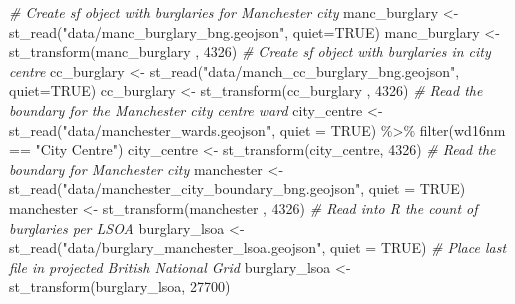 \documentclass[
  krantz2]{krantz}
\makeatletter
\newenvironment{Shaded}{\begin{snugshade}}{\end{snugshade}}
\newcommand{\AttributeTok}[1]{\textcolor[rgb]{0.61,0.61,0.61}{#1}}
\newcommand{\CommentTok}[1]{\textcolor[rgb]{0.37,0.37,0.37}{\textit{#1}}}
\newcommand{\ConstantTok}[1]{\textcolor[rgb]{0,0,0}{#1}}
\newcommand{\DecValTok}[1]{\textcolor[rgb]{0.06,0.06,0.06}{#1}}
\newcommand{\FunctionTok}[1]{\textcolor[rgb]{0,0,0}{#1}}
\newcommand{\NormalTok}[1]{#1}
\newcommand{\OtherTok}[1]{\textcolor[rgb]{0.37,0.37,0.37}{#1}}
\newcommand{\SpecialCharTok}[1]{\textcolor[rgb]{0,0,0}{#1}}
\newcommand{\StringTok}[1]{\textcolor[rgb]{0.5,0.5,0.5}{#1}}
\newenvironment{kframe}{%
\medskip{}
\setlength{\fboxsep}{.8em}
 \def\at@end@of@kframe{}%
 \ifinner\ifhmode%
  \def\at@end@of@kframe{\end{minipage}}%
  \begin{minipage}{\columnwidth}%
 \fi\fi%
 \def\FrameCommand##1{\hskip\@totalleftmargin \hskip-\fboxsep
 \colorbox{shadecolor}{##1}\hskip-\fboxsep
     \hskip-\linewidth \hskip-\@totalleftmargin \hskip\columnwidth}%
 \MakeFramed {\advance\hsize-\width
   \@totalleftmargin\z@ \linewidth\hsize
   \@setminipage}}%
 {\par\unskip\endMakeFramed%
 \at@end@of@kframe}
\renewenvironment{Shaded}{\begin{kframe}}{\end{kframe}}
\makeatother
\begin{document}
\begin{Shaded}
\begin{Highlighting}[]
\CommentTok{\# Create sf object with burglaries for Manchester city}
\NormalTok{manc\_burglary }\OtherTok{\textless{}{-}} \FunctionTok{st\_read}\NormalTok{(}\StringTok{"data/manc\_burglary\_bng.geojson"}\NormalTok{,}
                         \AttributeTok{quiet=}\ConstantTok{TRUE}\NormalTok{)}
\NormalTok{manc\_burglary }\OtherTok{\textless{}{-}} \FunctionTok{st\_transform}\NormalTok{(manc\_burglary , }\DecValTok{4326}\NormalTok{)}
\CommentTok{\# Create sf object with burglaries in city centre}
\NormalTok{cc\_burglary }\OtherTok{\textless{}{-}} \FunctionTok{st\_read}\NormalTok{(}\StringTok{"data/manch\_cc\_burglary\_bng.geojson"}\NormalTok{,}
                       \AttributeTok{quiet=}\ConstantTok{TRUE}\NormalTok{)}
\NormalTok{cc\_burglary }\OtherTok{\textless{}{-}} \FunctionTok{st\_transform}\NormalTok{(cc\_burglary , }\DecValTok{4326}\NormalTok{)}
\CommentTok{\# Read the boundary for the Manchester city centre ward}
\NormalTok{city\_centre }\OtherTok{\textless{}{-}} \FunctionTok{st\_read}\NormalTok{(}\StringTok{"data/manchester\_wards.geojson"}\NormalTok{, }
                       \AttributeTok{quiet =} \ConstantTok{TRUE}\NormalTok{) }\SpecialCharTok{\%\textgreater{}\%}
  \FunctionTok{filter}\NormalTok{(wd16nm }\SpecialCharTok{==} \StringTok{"City Centre"}\NormalTok{)}
\NormalTok{city\_centre }\OtherTok{\textless{}{-}} \FunctionTok{st\_transform}\NormalTok{(city\_centre, }\DecValTok{4326}\NormalTok{)}
\CommentTok{\# Read the boundary for Manchester city}
\NormalTok{manchester }\OtherTok{\textless{}{-}} \FunctionTok{st\_read}\NormalTok{(}\StringTok{"data/manchester\_city\_boundary\_bng.geojson"}\NormalTok{,}
                      \AttributeTok{quiet =} \ConstantTok{TRUE}\NormalTok{)}
\NormalTok{manchester }\OtherTok{\textless{}{-}} \FunctionTok{st\_transform}\NormalTok{(manchester , }\DecValTok{4326}\NormalTok{)}
\CommentTok{\# Read into R the count of burglaries per LSOA}
\NormalTok{burglary\_lsoa }\OtherTok{\textless{}{-}} \FunctionTok{st\_read}\NormalTok{(}\StringTok{"data/burglary\_manchester\_lsoa.geojson"}\NormalTok{,}
                    \AttributeTok{quiet =} \ConstantTok{TRUE}\NormalTok{)}
\CommentTok{\# Place last file in projected British National Grid}
\NormalTok{burglary\_lsoa }\OtherTok{\textless{}{-}} \FunctionTok{st\_transform}\NormalTok{(burglary\_lsoa, }\DecValTok{27700}\NormalTok{)}
\end{Highlighting}
\end{Shaded}
\end{document}
